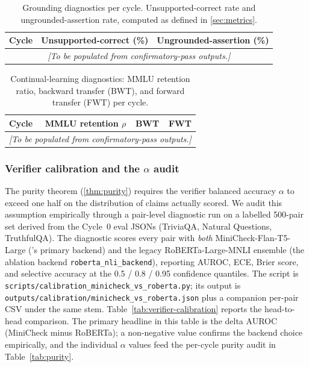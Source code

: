 \begin{table}[t]
\centering
\caption{Grounding diagnostics per cycle. Unsupported-correct rate and
ungrounded-assertion rate, computed as defined in \cref{sec:metrics}.}
\label{tab:grounding}
\begin{tabular}{lrr}
\toprule
Cycle & Unsupported-correct (\%) & Ungrounded-assertion (\%) \\
\midrule
\multicolumn{3}{c}{\emph{[To be populated from confirmatory-pass outputs.]}}\\
\bottomrule
\end{tabular}
\end{table}

\begin{table}[t]
\centering
\caption{Continual-learning diagnostics: MMLU retention ratio,
backward transfer (BWT), and forward transfer (FWT) per cycle.}
\label{tab:continual}
\begin{tabular}{lrrr}
\toprule
Cycle & MMLU retention $\rho$ & BWT & FWT \\
\midrule
\multicolumn{4}{c}{\emph{[To be populated from confirmatory-pass outputs.]}}\\
\bottomrule
\end{tabular}
\end{table}

\subsubsection{Verifier calibration and the $\alpha$ audit}
\label{sec:verification-balanced-accuracy}

The purity theorem (\cref{thm:purity}) requires the verifier balanced
accuracy $\alpha$ to exceed one half on the distribution of claims
actually scored. We audit this assumption empirically through a
pair-level diagnostic run on a labelled 500-pair set derived from the
Cycle~0 eval JSONs (TriviaQA, Natural Questions, TruthfulQA). The
diagnostic scores every pair with \emph{both} MiniCheck-Flan-T5-Large
(\caem{}'s primary backend) and the legacy RoBERTa-Large-MNLI
ensemble (the ablation backend \texttt{roberta\_nli\_backend}),
reporting AUROC, ECE, Brier score, and selective accuracy at the 0.5
/ 0.8 / 0.95 confidence quantiles. The script is
\texttt{scripts/calibration\_minicheck\_vs\_roberta.py}; its output is
\texttt{outputs/calibration/minicheck\_vs\_roberta.json} plus a
companion per-pair CSV under the same stem.
Table~\ref{tab:verifier-calibration} reports the head-to-head
comparison. The primary headline in this table is the delta AUROC
(MiniCheck minus RoBERTa); a non-negative value confirms the backend
choice empirically, and the individual $\alpha$ values feed the
per-cycle purity audit in Table~\ref{tab:purity}.

